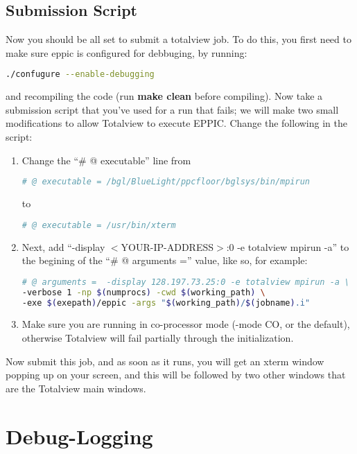 \subsection{Submission Script}
Now you should be all set to submit a totalview job. To do this, you
first need to make sure eppic is configured for debbuging, by running:
\begin{lstlisting}[language=Bash]
  ./confugure --enable-debugging
\end{lstlisting}
\noindent and recompiling the code (run \textbf{make clean} before
compiling). Now take a submission script that you've used for a run
that fails; we will make two small modifications to allow Totalview to
execute EPPIC. Change the following in the script:
\begin{enumerate}
\item Change the ``\# @ executable'' line from 
\begin{lstlisting}[language=Bash]
# @ executable = /bgl/BlueLight/ppcfloor/bglsys/bin/mpirun
\end{lstlisting}
to
\begin{lstlisting}[language=Bash]
# @ executable = /usr/bin/xterm
\end{lstlisting}
\item Next, add ``-display $<$YOUR-IP-ADDRESS$>$:0 -e totalview
  mpirun -a'' to the begining of the ``\# @ arguments ='' value, like
  so, for example:
\begin{lstlisting}[language=Bash]
# @ arguments =  -display 128.197.73.25:0 -e totalview mpirun -a \
-verbose 1 -np $(numprocs) -cwd $(working_path) \
-exe $(exepath)/eppic -args "$(working_path)/$(jobname).i"
\end{lstlisting}
\item Make sure you are running in co-processor mode (-mode CO, or the
  default), otherwise Totalview will fail partially through the
  initialization. 
\end{enumerate}

Now submit this job, and as soon as it runs, you will get an xterm
window popping up on your screen, and this will be followed by two
other windows that are the Totalview main windows.

\section{Debug-Logging}